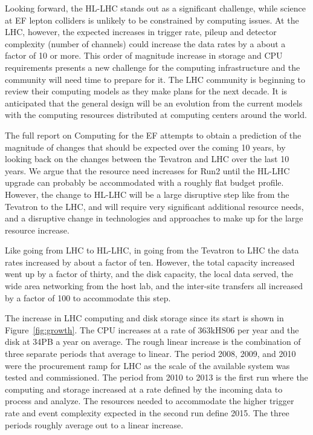 Looking forward, the HL-LHC stands out as a significant challenge, while
science at EF lepton colliders is unlikely to be constrained by
computing issues. 
At the LHC, however, the expected increases in trigger rate, pileup and detector
complexity (number of channels) could increase the data rates by a about a
factor of 10 or more.   This order of magnitude increase in storage and CPU
requirements presents a new challenge for the computing infrastructure and the
community will need time to prepare for it. The LHC community is beginning to
review their computing models as they make plans for the next decade.  It is
anticipated that the general design will be an evolution from the current
models with the computing resources distributed at computing centers around
the world.

The full report on Computing for the EF attempts 
to obtain a prediction of the magnitude of
changes that should be expected over the coming 10 years, by looking back on 
the changes between the Tevatron and LHC over the last 10 years. We argue that 
the resource need increases for Run2 until the HL-LHC upgrade can probably be 
accommodated with a roughly flat budget profile. However, the change to HL-LHC
will be a large disruptive step like from the Tevatron to the LHC, and will require
very significant additional resource needs, and a disruptive change in
technologies and approaches to make up for the large resource increase. 

Like going from LHC to HL-LHC, in going from the Tevatron to LHC 
the data rates increased by about a factor of ten. However, 
the total capacity increased went up by a factor of thirty, 
and the disk capacity, the local data served, the wide area
networking from the host lab, and the inter-site transfers all
increased by a factor of 100 to accommodate this step. 

The increase in LHC computing and disk storage since its start is shown in
Figure~\ref{fig:growth}.  The CPU increases at a rate of 363kHS06 per
year and the disk at 34PB a year on average.  The rough linear
increase is the combination of three separate periods that average to
linear.  The period 2008, 2009, and 2010 were the procurement ramp for
LHC as the scale of the available system was tested and commissioned.
The period from 2010 to 2013 is the first run where the computing and
storage increased at a rate defined by the incoming data to process
and analyze.  The resources needed to accommodate the higher trigger
rate and event complexity expected in the second run define 2015.  The
three periods roughly average out to a linear increase.

